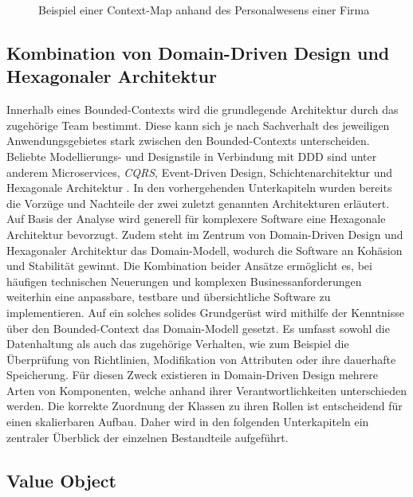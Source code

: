 \begin{figure}[H]
	\vspace{0.3cm}
	\centering
	\footnotesize
	
	\caption{Beispiel einer Context-Map anhand des Personalwesens einer Firma}
	\label{fig:Context-Map-Example}
\end{figure}

\subsection{Kombination von Domain-Driven Design und Hexagonaler Architektur}

Innerhalb eines Bounded-Contexts wird die grundlegende Architektur durch das zugehörige Team bestimmt. Diese kann sich je nach Sachverhalt des jeweiligen Anwendungsgebietes stark zwischen den Bounded-Contexts unterscheiden. Beliebte Modellierungs- und Designstile in Verbindung mit DDD sind unter anderem Microservices, \emph{\acrfull{CQRS}}, Event-Driven Design, Schichtenarchitektur und Hexagonale Architektur \cite[S. 113ff.]{Vernon.2015}. In den vorhergehenden Unterkapiteln wurden bereits die Vorzüge und Nachteile der zwei zuletzt genannten Architekturen erläutert. Auf Basis der Analyse wird generell für komplexere Software eine Hexagonale Architektur bevorzugt. Zudem steht im Zentrum von Domain-Driven Design und Hexagonaler Architektur das Domain-Modell, wodurch die Software an Kohäsion und Stabilität gewinnt. Die Kombination beider Ansätze ermöglicht es, bei häufigen technischen Neuerungen und komplexen Businessanforderungen weiterhin eine anpassbare, testbare und übersichtliche Software zu implementieren. Auf ein solches solides Grundgerüst wird mithilfe der Kenntnisse über den Bounded-Context das Domain-Modell gesetzt. Es umfasst sowohl die Datenhaltung als auch das zugehörige Verhalten, wie zum Beispiel die Überprüfung von Richtlinien, Modifikation von Attributen oder ihre dauerhafte Speicherung. Für diesen Zweck existieren in Domain-Driven Design mehrere Arten von Komponenten, welche anhand ihrer Verantwortlichkeiten unterschieden werden. Die korrekte Zuordnung der Klassen zu ihren Rollen ist entscheidend für einen skalierbaren Aufbau. Daher wird in den folgenden Unterkapiteln ein zentraler Überblick der einzelnen Bestandteile aufgeführt.

\subsection{Value Object}

